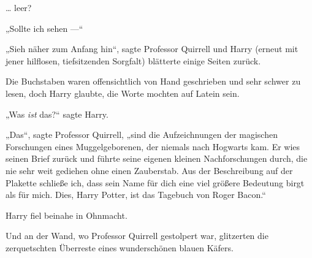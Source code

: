 … leer?

„Sollte ich sehen —“

„Sieh näher zum Anfang hin“, sagte Professor Quirrell und Harry (erneut mit jener hilflosen, tiefsitzenden Sorgfalt) blätterte einige Seiten zurück.

Die Buchstaben waren offensichtlich von Hand geschrieben und sehr schwer zu lesen, doch Harry glaubte, die Worte mochten auf Latein sein.

„Was \emph{ist} das?“ sagte Harry.

„Das“, sagte Professor Quirrell, „sind die Aufzeichnungen der magischen Forschungen eines Muggelgeborenen, der niemals nach Hogwarts kam. Er wies seinen Brief zurück und führte seine eigenen kleinen Nachforschungen durch, die nie sehr weit gediehen ohne einen Zauberstab. Aus der Beschreibung auf der Plakette schließe ich, dass sein Name für dich eine viel größere Bedeutung birgt als für mich. Dies, Harry Potter, ist das Tagebuch von Roger Bacon.“

Harry fiel beinahe in Ohnmacht.

Und an der Wand, wo Professor Quirrell gestolpert war, glitzerten die zerquetschten Überreste eines wunderschönen blauen Käfers.

